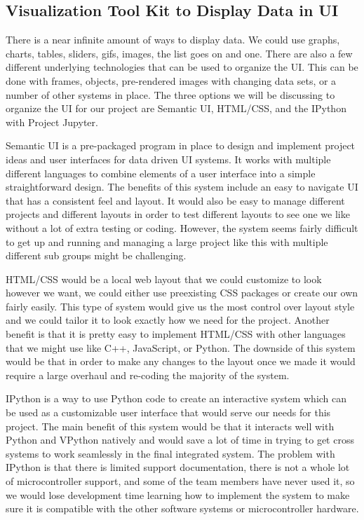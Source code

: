 \documentclass[10pt,draftclsnofoot,onecolumn,retainorgcmds]{IEEEtran}
\begin{document}
\subsection{Visualization Tool Kit to Display Data in UI}

There is a near infinite amount of ways to display data. We could use graphs, charts, tables, sliders, gifs, images, the list goes on and one. There are also a few different underlying technologies that can be used to organize the UI. This can be done with frames, objects, pre-rendered images with changing data sets, or a number of other systems in place. The three options we will be discussing to organize the UI for our project are Semantic UI, HTML/CSS, and the IPython with Project Jupyter. \par

Semantic UI is a pre-packaged program in place to design and implement project ideas and user interfaces for data driven UI systems. It works with multiple different languages to combine elements of a user interface into a simple straightforward design. The benefits of this system include an easy to navigate UI that has a consistent feel and layout. It would also be easy to manage different projects and different layouts in order to test different layouts to see one we like without a lot of extra testing or coding. However, the system seems fairly difficult to get up and running and managing a large project like this with multiple different sub groups might be challenging. \par

HTML/CSS would be a local web layout that we could customize to look however we want, we could either use preexisting CSS packages or create our own fairly easily. This type of system would give us the most control over layout style and we could tailor it to look exactly how we need for the project. Another benefit is that it is pretty easy to implement HTML/CSS with other languages that we might use like C++, JavaScript, or Python. The downside of this system would be that in order to make any changes to the layout once we made it would require a large overhaul and re-coding the majority of the system. \par

IPython is a way to use Python code to create an interactive system which can be used as a customizable user interface that would serve our needs for this project. The main benefit of this system would be that it interacts well with Python and VPython natively and would save a lot of time in trying to get cross systems to work seamlessly in the final integrated system. The problem with IPython is that there is limited support documentation, there is not a whole lot of microcontroller support, and some of the team members have never used it, so we would lose development time learning how to implement the system to make sure it is compatible with the other software systems or microcontroller hardware.\par
\end{document}
